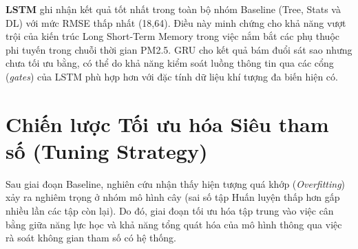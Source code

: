\textbf{LSTM} ghi nhận kết quả tốt nhất trong toàn bộ nhóm Baseline (Tree, Stats và DL) với mức RMSE thấp nhất (18,64). Điều này minh chứng cho khả năng vượt trội của kiến trúc Long Short-Term Memory trong việc nắm bắt các phụ thuộc phi tuyến trong chuỗi thời gian PM2.5. GRU cho kết quả bám đuổi sát sao nhưng chưa tối ưu bằng, có thể do khả năng kiểm soát luồng thông tin qua các cổng (\textit{gates}) của LSTM phù hợp hơn với đặc tính dữ liệu khí tượng đa biến hiện có.


\section{Chiến lược Tối ưu hóa Siêu tham số (Tuning Strategy)}
Sau giai đoạn Baseline, nghiên cứu nhận thấy hiện tượng quá khớp (\textit{Overfitting}) xảy ra nghiêm trọng ở nhóm mô hình cây (sai số tập Huấn luyện thấp hơn gấp nhiều lần các tập còn lại). Do đó, giai đoạn tối ưu hóa tập trung vào việc cân bằng giữa năng lực học và khả năng tổng quát hóa của mô hình thông qua việc rà soát không gian tham số có hệ thống.
